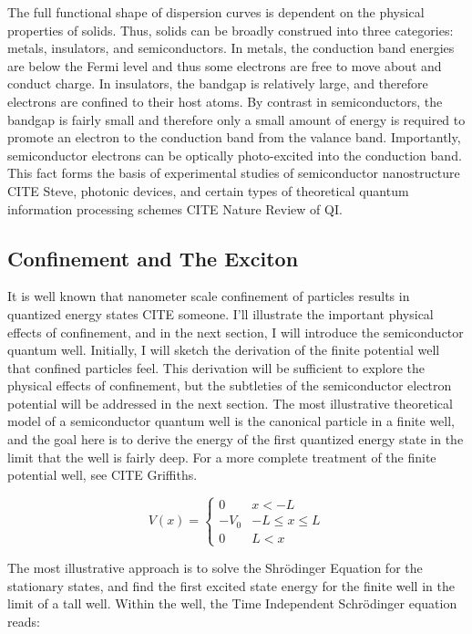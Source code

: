 \indent The full functional shape of dispersion curves is dependent on the physical properties of solids. Thus, solids can be broadly construed into three categories: metals, insulators, and semiconductors. In metals, the conduction band energies are below the Fermi level and thus some electrons are free to move about and conduct charge. In insulators, the bandgap is relatively large, and therefore electrons are confined to their host atoms. By contrast in semiconductors, the bandgap is fairly small and therefore only a small amount of energy is required to promote an electron to the conduction band from the valance band. Importantly, semiconductor electrons can be optically photo-excited into the conduction band. This fact forms the basis of experimental studies of semiconductor nanostructure CITE Steve, photonic devices, and certain types of theoretical quantum information processing schemes CITE Nature Review of QI.

\subsection{Confinement and The Exciton}

\indent It is well known that nanometer scale confinement of particles results in quantized energy states CITE someone. I'll illustrate the important physical effects of confinement, and in the next section, I will introduce the semiconductor quantum well. Initially, I will sketch the derivation of the finite potential well that confined particles feel. This derivation will be sufficient to explore the physical effects of confinement, but the subtleties of the semiconductor electron potential will be addressed in the next section. The most illustrative theoretical model of a semiconductor quantum well is the canonical particle in a finite well, and the goal here is to derive the energy of the first quantized energy state in the limit that the well is fairly deep. For a more complete treatment of the finite potential well, see CITE Griffiths.


 \[ V(x) = \begin{cases} 
      0 & x < -L \\
      -V_0 & -L\leq x\leq  L \\
      0 & L <  x 
   \end{cases}
\]

The most illustrative approach is to solve the Shr\"{o}dinger Equation for the stationary states, and find the first excited state energy for the finite well in the limit of a tall well. Within the well, the Time Independent Schr\"{o}dinger equation reads:

